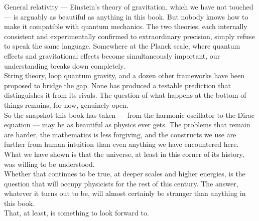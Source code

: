 \documentclass[krantz1,ChapterTOCs]{krantz}
\begin{document}
General relativity --- Einstein's theory of gravitation, which we
have not touched --- is arguably as beautiful as anything in this
book. But nobody knows how to make it compatible with quantum
mechanics. The two theories, each internally consistent and
experimentally confirmed to extraordinary precision, simply refuse
to speak the same language. Somewhere at the Planck scale, where
quantum effects and gravitational effects become simultaneously
important, our understanding breaks down completely.\\

String theory, loop quantum gravity, and a dozen other frameworks
have been proposed to bridge the gap. None has produced a
testable prediction that distinguishes it from its rivals. The
question of what happens at the bottom of things remains, for now,
genuinely open.\\

So the snapshot this book has taken --- from the harmonic oscillator
to the Dirac equation --- may be as beautiful as physics ever gets.
The problems that remain are harder, the mathematics is less forgiving, and the constructs we use are further from human intuition than
even anything we have encountered here.\\

What we have shown is that the universe, at least in this corner
of its history, was willing to be understood.\\

Whether that continues to be true, at deeper scales and higher
energies, is the question that will occupy physicists for the rest
of this century. The answer, whatever it turns out to be, will
almost certainly be stranger than anything in this book.\\

That, at least, is something to look forward to.\\


%
%

\printindex
\end{document}
